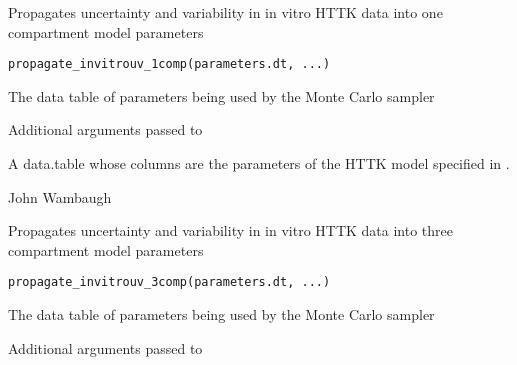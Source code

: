\documentclass[a4paper]{book}
\begin{document}
%
\begin{Description}\relax
Propagates uncertainty and variability in in vitro HTTK data into one
compartment model parameters
\end{Description}
%
\begin{Usage}
\begin{verbatim}
propagate_invitrouv_1comp(parameters.dt, ...)
\end{verbatim}
\end{Usage}
%
\begin{Arguments}
\begin{ldescription}
\item[\code{parameters.dt}] The data table of parameters being used by the Monte
Carlo sampler

\item[\code{...}] Additional arguments passed to 
\end{ldescription}
\end{Arguments}
%
\begin{Value}
A data.table whose columns are the parameters of the HTTK model
specified in .
\end{Value}
%
\begin{Author}\relax
John Wambaugh
\end{Author}
%
\begin{Description}\relax
Propagates uncertainty and variability in in vitro HTTK data into three
compartment model parameters
\end{Description}
%
\begin{Usage}
\begin{verbatim}
propagate_invitrouv_3comp(parameters.dt, ...)
\end{verbatim}
\end{Usage}
%
\begin{Arguments}
\begin{ldescription}
\item[\code{parameters.dt}] The data table of parameters being used by the Monte
Carlo sampler

\item[\code{...}] Additional arguments passed to 
\end{ldescription}
\end{Arguments}
\end{document}

